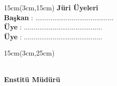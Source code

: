 \documentclass[a4paper,12pt]{article}
\begin{document}
\begin{textblock*}{15cm}(3cm,15cm)
		\noindent\textbf{Jüri Üyeleri} \\
		
		\noindent\textbf{Başkan} \hspace{0.1cm}:
		\textbf{\BASKAN} \hfill 
            .........................................  \\
		
		\noindent\textbf{Üye} \hspace{0.7cm}:
		\noindent\textbf{\JURIA} \hfill \hfill
		......................................... \\
		
		\noindent\textbf{Üye} \hspace{0.7cm}:
		\noindent\textbf{\JURIB} \hfill \hfill 
            ......................................... \\
		

            
\end{textblock*}  

\begin{textblock*}{15cm}(3cm,25cm)
            \begin{center}
            \textbf{
            \ENSTITUMUD\\
            Enstitü Müdürü  
            }
            \end{center}
\end{textblock*}
\end{document}
